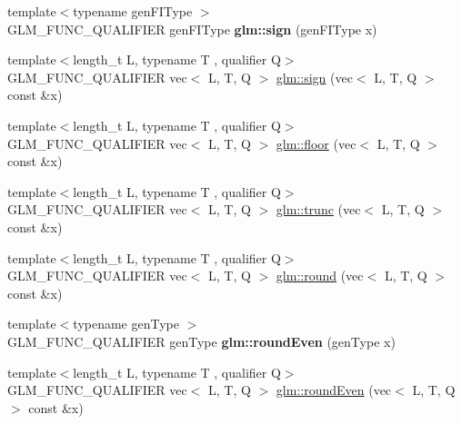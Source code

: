\begin{DoxyCompactItemize}
\item 
\mbox{\label{func__common_8inl_a4cb99d6c397185120f49d1d56cf45b84}} 
{\footnotesize template$<$typename gen\+F\+I\+Type $>$ }\\G\+L\+M\+\_\+\+F\+U\+N\+C\+\_\+\+Q\+U\+A\+L\+I\+F\+I\+ER gen\+F\+I\+Type {\bfseries glm\+::sign} (gen\+F\+I\+Type x)
\item 
{\footnotesize template$<$length\+\_\+t L, typename T , qualifier Q$>$ }\\G\+L\+M\+\_\+\+F\+U\+N\+C\+\_\+\+Q\+U\+A\+L\+I\+F\+I\+ER vec$<$ L, T, Q $>$ \hyperlink{group__core__func__common_ga1e2e5cfff800056540e32f6c9b604b28}{glm\+::sign} (vec$<$ L, T, Q $>$ const \&x)
\item 
{\footnotesize template$<$length\+\_\+t L, typename T , qualifier Q$>$ }\\G\+L\+M\+\_\+\+F\+U\+N\+C\+\_\+\+Q\+U\+A\+L\+I\+F\+I\+ER vec$<$ L, T, Q $>$ \hyperlink{group__core__func__common_gaa9d0742639e85b29c7c5de11cfd6840d}{glm\+::floor} (vec$<$ L, T, Q $>$ const \&x)
\item 
{\footnotesize template$<$length\+\_\+t L, typename T , qualifier Q$>$ }\\G\+L\+M\+\_\+\+F\+U\+N\+C\+\_\+\+Q\+U\+A\+L\+I\+F\+I\+ER vec$<$ L, T, Q $>$ \hyperlink{group__core__func__common_gaf9375e3e06173271d49e6ffa3a334259}{glm\+::trunc} (vec$<$ L, T, Q $>$ const \&x)
\item 
{\footnotesize template$<$length\+\_\+t L, typename T , qualifier Q$>$ }\\G\+L\+M\+\_\+\+F\+U\+N\+C\+\_\+\+Q\+U\+A\+L\+I\+F\+I\+ER vec$<$ L, T, Q $>$ \hyperlink{group__core__func__common_gafa03aca8c4713e1cc892aa92ca135a7e}{glm\+::round} (vec$<$ L, T, Q $>$ const \&x)
\item 
\mbox{\label{func__common_8inl_ae02684863360f29d6e9fb9b5ad4ab5d9}} 
{\footnotesize template$<$typename gen\+Type $>$ }\\G\+L\+M\+\_\+\+F\+U\+N\+C\+\_\+\+Q\+U\+A\+L\+I\+F\+I\+ER gen\+Type {\bfseries glm\+::round\+Even} (gen\+Type x)
\item 
{\footnotesize template$<$length\+\_\+t L, typename T , qualifier Q$>$ }\\G\+L\+M\+\_\+\+F\+U\+N\+C\+\_\+\+Q\+U\+A\+L\+I\+F\+I\+ER vec$<$ L, T, Q $>$ \hyperlink{group__core__func__common_ga76b81785045a057989a84d99aeeb1578}{glm\+::round\+Even} (vec$<$ L, T, Q $>$ const \&x)
\item 

\end{DoxyCompactItemize}
